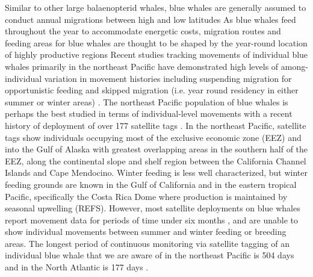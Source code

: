 \documentclass[a4paper,12pt]{article}
\begin{document}
Similar to other large balaenopterid whales, blue whales are generally assumed to conduct annual migrations between high and low latitudes %
As blue whales feed throughout the year to accommodate energetic costs, migration routes and feeding areas for blue whales are thought to be shaped by the year-round location of highly productive regions %
Recent studies tracking movements of individual blue whales primarily in the northeast Pacific have demonstrated high levels of among-individual variation in movement histories including suspending migration for opportunistic feeding and skipped migration (i.e. year round residency in either summer or winter
areas) \cite{busquets2017estimating}. 
The northeast Pacific population of blue whales is perhaps the best studied in terms of individual-level movements with a recent history of deployment of over 177 satellite tags \cite{irvine2017quantifying, mate2007evolution}.
In the northeast Pacific, satellite tags show individuals occupying most of the exclusive economic zone (EEZ) and into the Gulf of Alaska \cite{irvine2017quantifying} with greatest overlapping areas in the southern half of the EEZ, along the continental slope and shelf region between the California Channel Islands and Cape Mendocino. 
Winter feeding is less well characterized, but winter feeding grounds are known
in the Gulf of California and in the eastern tropical Pacific, specifically the Costa Rica Dome where production is maintained by seasonal upwelling (REFS). %
However, most satellite deployments on blue whales report movement data for periods of time under six months \cite{heide2001new, silva2013north, bailey2009behavioural, lesage2017foraging, irvine2017quantifying}, and are unable to show individual movements between summer and winter feeding or breeding areas. 
The longest period of continuous monitoring via satellite tagging of an individual blue whale that we are aware of in the northeast Pacific is 504 days \cite{irvine2017quantifying} and in the North Atlantic is 177 days \cite{lesage2017foraging}.
\end{document}
